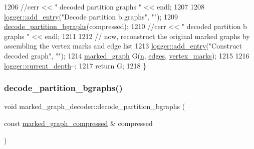 \begin{DoxyCode}
1206   \textcolor{comment}{//cerr << " decoded partition graphs " << endl;}
1207 
1208   \hyperlink{classlogger_a710163deb17bc81f70d53d285b8ac9ac}{logger::add\_entry}(\textcolor{stringliteral}{"Decode partition b graphs"}, \textcolor{stringliteral}{""});
1209   \hyperlink{classmarked__graph__decoder_aea53529191c7d56a897620b3d842ffaa}{decode\_partition\_bgraphs}(compressed);
1210   \textcolor{comment}{//cerr << " decoded partition b graphs " << endl;}
1211 
1212   \textcolor{comment}{// now, reconstruct the original marked graphs by assembling the vertex marks and edge list}
1213   \hyperlink{classlogger_a710163deb17bc81f70d53d285b8ac9ac}{logger::add\_entry}(\textcolor{stringliteral}{"Construct decoded graph"}, \textcolor{stringliteral}{""});
1214   \hyperlink{classmarked__graph}{marked\_graph} G(\hyperlink{classmarked__graph__decoder_aefc93611bc4a3e9a5d3956d97649a0e9}{n}, \hyperlink{classmarked__graph__decoder_af9e75da0a495d9c3bdcd169e15e3261e}{edges}, \hyperlink{classmarked__graph__decoder_a98be932a5abff7efbc8dd4290268b69a}{vertex\_marks});
1215 
1216   \hyperlink{classlogger_a9d29b49bd318a719a8e85b59eac54fe0}{logger::current\_depth}--;
1217   \textcolor{keywordflow}{return} G;
1218 \}
\end{DoxyCode}
\mbox{\label{classmarked__graph__decoder_aea53529191c7d56a897620b3d842ffaa}} 
\subsubsection{\texorpdfstring{decode\+\_\+partition\+\_\+bgraphs()}{decode\_partition\_bgraphs()}}
{\footnotesize\ttfamily void marked\+\_\+graph\+\_\+decoder\+::decode\+\_\+partition\+\_\+bgraphs (\begin{DoxyParamCaption}\item[{const \hyperlink{classmarked__graph__compressed}{marked\+\_\+graph\+\_\+compressed} \&}]{compressed }\end{DoxyParamCaption})\hspace{0.3cm}{\ttfamily [private]}}


